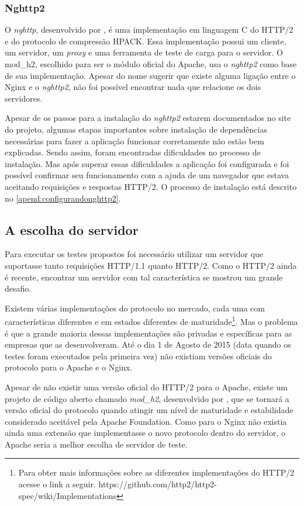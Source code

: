 \subsubsection{Nghttp2}
\label{nghttp2}

O \textit{nghttp}, desenvolvido por , é uma implementação em linguagem C do HTTP/2 e do protocolo de compressão HPACK. Essa implementação possui um cliente, um servidor, um \textit{proxy} e uma ferramenta de teste de carga para o servidor. O mod\_h2, escolhido para ser o módulo oficial do Apache, usa o \textit{nghttp2} como base de sua implementação. Apesar do nome sugerir que existe alguma ligação entre o Nginx e o \textit{nghttp2}, não foi possível encontrar nada que relacione os dois servidores.

Apesar de os passos para a instalação do \textit{nghttp2} estarem documentados no site do projeto, algumas etapas importantes sobre instalação de dependências necessárias para fazer a aplicação funcionar corretamente não estão bem explicadas. Sendo assim, foram encontradas dificuldades no processo de instalação. Mas após superar essas dificuldades a aplicação foi configurada e foi possível confirmar seu funcionamento com a ajuda de um navegador que estava aceitando requisições e respostas HTTP/2. O processo de instalação está descrito no \autoref{apend:configurandonghttp2}.

\subsection{A escolha do servidor}
\label{aescolhadoservidor}

Para executar os testes propostos foi necessário utilizar um servidor que suportasse tanto requisições HTTP/1.1 quanto HTTP/2. Como o HTTP/2 ainda é recente, encontrar um servidor com tal característica se mostrou um grande desafio.

Existem várias implementações do protocolo no mercado, cada uma com características diferentes e em estados diferentes de maturidade\footnote{Para obter mais informações sobre as diferentes implementações do HTTP/2 acesse o link a seguir. https://github.com/http2/http2-spec/wiki/Implementations}. Mas o problema é que a grande maioria dessas implementações são privadas e específicas para as empresas que as desenvolveram. Até o dia 1 de Agosto de 2015 (data quando os testes foram executados pela primeira vez) não existiam versões oficiais do protocolo para o Apache e o Nginx.

Apesar de não existir uma versão oficial do HTTP/2 para o Apache, existe um projeto de código aberto chamado \textit{mod\_h2}, desenvolvido por , que se tornará a versão oficial do protocolo quando atingir um nível de maturidade e estabilidade considerado aceitável pela Apache Foundation. Como para o Nginx não existia ainda uma extensão que implementasse o novo protocolo dentro do servidor, o Apache seria a melhor escolha de servidor de teste.

